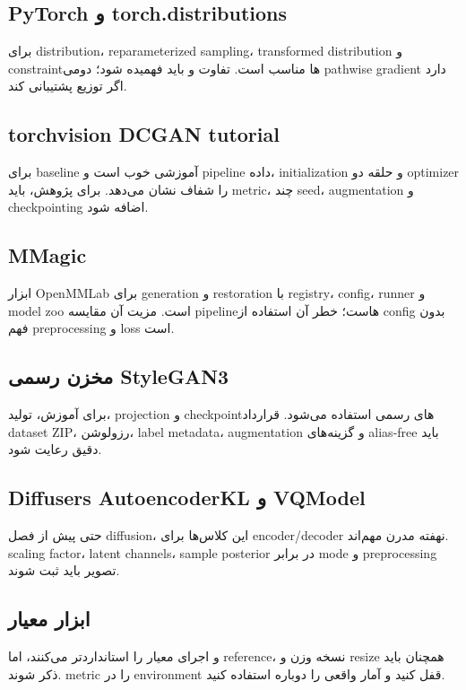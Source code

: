 \documentclass[12pt,openany,oneside]{book}
\begin{document}
\subsection{PyTorch و torch.distributions}
برای distribution، reparameterized sampling، transformed distribution و constraintها مناسب است. تفاوت  و  باید فهمیده شود؛ دومی pathwise gradient دارد اگر توزیع پشتیبانی کند.

\subsection{torchvision DCGAN tutorial}
برای baseline آموزشی خوب است و pipeline داده، initialization و حلقه دو optimizer را شفاف نشان می‌دهد. برای پژوهش، باید metric، چند seed، augmentation و checkpointing اضافه شود.

\subsection{MMagic}
ابزار OpenMMLab برای generation و restoration با registry، config، runner و model zoo است. مزیت آن مقایسه pipelineهاست؛ خطر آن استفاده از config بدون فهم preprocessing و loss است.

\subsection{مخزن رسمی StyleGAN3}
برای آموزش، تولید، projection و checkpointهای رسمی استفاده می‌شود. قرارداد dataset ZIP، رزولوشن، label metadata، augmentation و گزینه‌های alias-free باید دقیق رعایت شود.

\subsection{Diffusers AutoencoderKL و VQModel}
حتی پیش از فصل diffusion، این کلاس‌ها برای encoder/decoder نهفته مدرن مهم‌اند. scaling factor، latent channels، sample posterior در برابر mode و preprocessing تصویر باید ثبت شوند.

\subsection{ابزار معیار}
 و  اجرای معیار را استانداردتر می‌کنند، اما reference، نسخه وزن و resize همچنان باید ذکر شوند. metric را در environment قفل کنید و آمار واقعی را دوباره استفاده کنید.
\end{document}
